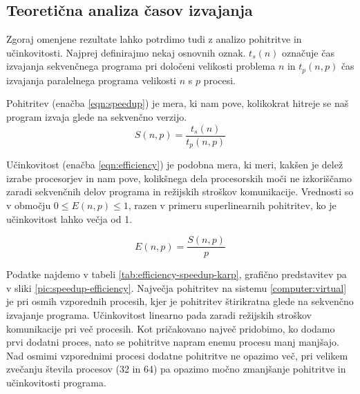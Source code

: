 \documentclass[a4paper,12pt]{book}
\begin{document}
\subsection{Teoretična analiza časov izvajanja}
Zgoraj omenjene rezultate lahko potrdimo tudi z analizo pohitritve in učinko\-vitosti. Najprej definirajmo nekaj osnovnih oznak. $t_s(n)$ označuje čas izvajanja sekvenčnega programa pri določeni velikosti problema $n$ in $t_p(n,p)$ čas izvajanja paralelnega programa velikosti $n$ s $p$ procesi. 

Pohitritev (enačba \ref{eqn:speedup}) je mera, ki nam pove, kolikokrat hitreje se naš program izvaja glede na sekvenčno verzijo. 
\begin{equation}
\label{eqn:speedup}
S(n,p) = \frac{t_s(n)}{t_p(n,p)}
\end{equation}

Učinkovitost (enačba \ref{eqn:efficiency}) je podobna mera, ki meri, kakšen je delež izrabe procesorjev in nam pove, kolikšnega dela procesorskih moči ne izkoriščamo zaradi sekvenčnih delov programa in režijskih stroškov komunikacije. Vrednosti so v območju $0 \leq E(n,p) \leq 1$, razen v primeru superlinearnih pohitritev, ko je učinkovitost lahko večja od 1. 

\begin{equation}
\label{eqn:efficiency}
E(n,p) = \frac{S(n,p)}{p}
\end{equation}

Podatke najdemo v tabeli \ref{tab:efficiency-speedup-karp}, grafično predstavitev pa v sliki \ref{pic:speedup-efficiency}. Največja pohitritev na sistemu \ref{computer:virtual} je pri osmih vzporednih procesih, kjer je pohitritev štirikratna glede na sekvenčno izvajanje programa. Učinkovitost linearno pada zaradi režijskih stroškov komunikacije pri več procesih. Kot pričakovano največ pridobimo, ko dodamo prvi dodatni proces, nato se pohitritve napram enemu procesu manj manjšajo. Nad osmimi vzporednimi procesi dodatne pohitritve ne opazimo več, pri velikem zvečanju števila procesov (32 in 64) pa opazimo močno zmanjšanje pohitritve in učinkovitosti programa. 
\end{document}
